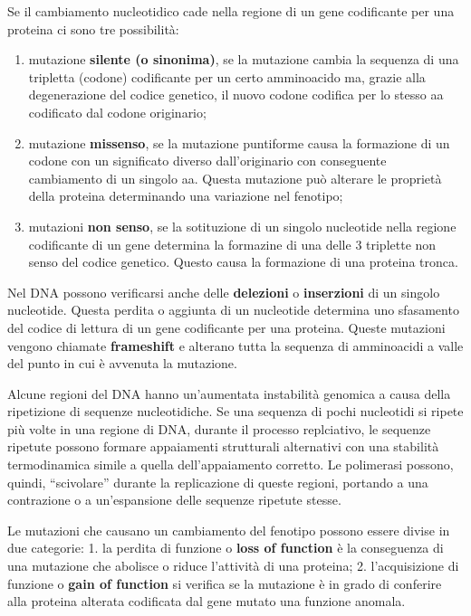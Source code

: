 \documentclass[11pt]{book}
\begin{document}
Se il cambiamento nucleotidico cade nella regione di un gene codificante
per una proteina ci sono tre possibilità:

\begin{enumerate}
\def\labelenumi{\arabic{enumi}.}
\itemsep1pt\parskip0pt
\item
  mutazione \textbf{silente (o sinonima)}, se la mutazione cambia la
  sequenza di una tripletta (codone) codificante per un certo
  amminoacido ma, grazie alla degenerazione del codice genetico, il
  nuovo codone codifica per lo stesso aa codificato dal codone
  originario;
\item
  mutazione \textbf{missenso}, se la mutazione puntiforme causa la
  formazione di un codone con un significato diverso dall'originario con
  conseguente cambiamento di un singolo aa. Questa mutazione può
  alterare le proprietà della proteina determinando una variazione nel
  fenotipo;
\item
  mutazioni \textbf{non senso}, se la sotituzione di un singolo
  nucleotide nella regione codificante di un gene determina la formazine
  di una delle 3 triplette non senso del codice genetico. Questo causa
  la formazione di una proteina tronca.
\end{enumerate}

Nel DNA possono verificarsi anche delle \textbf{delezioni} o
\textbf{inserzioni} di un singolo nucleotide. Questa perdita o aggiunta
di un nucleotide determina uno sfasamento del codice di lettura di un
gene codificante per una proteina. Queste mutazioni vengono chiamate
\textbf{frameshift} e alterano tutta la sequenza di amminoacidi a valle
del punto in cui è avvenuta la mutazione.

Alcune regioni del DNA hanno un'aumentata instabilità genomica a causa
della ripetizione di sequenze nucleotidiche. Se una sequenza di pochi
nucleotidi si ripete più volte in una regione di DNA, durante il
processo replciativo, le sequenze ripetute possono formare appaiamenti
strutturali alternativi con una stabilità termodinamica simile a quella
dell'appaiamento corretto. Le polimerasi possono, quindi, ``scivolare''
durante la replicazione di queste regioni, portando a una contrazione o
a un'espansione delle sequenze ripetute stesse.

Le mutazioni che causano un cambiamento del fenotipo possono essere
divise in due categorie: 1. la perdita di funzione o \textbf{loss of
function} è la conseguenza di una mutazione che abolisce o riduce
l'attività di una proteina; 2. l'acquisizione di funzione o \textbf{gain
of function} si verifica se la mutazione è in grado di conferire alla
proteina alterata codificata dal gene mutato una funzione anomala.
\end{document}
